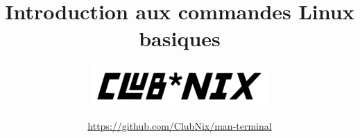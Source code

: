 \title{Introduction aux commandes Linux basiques}
\author{\includegraphics[scale=0.7]{res/Images/clubnix}}
\date{\url{https://github.com/ClubNix/man-terminal}}

\maketitle

\vfill
\pagebreak
\newpage
\thispagestyle{empty}
~


\strut\thispagestyle{empty}
\vfill
\pagebreak
\tableofcontents
\strut\thispagestyle{empty}

\vfill
\pagebreak
\newpage
\thispagestyle{empty}
~
\pagebreak

\setcounter{page}{1}
